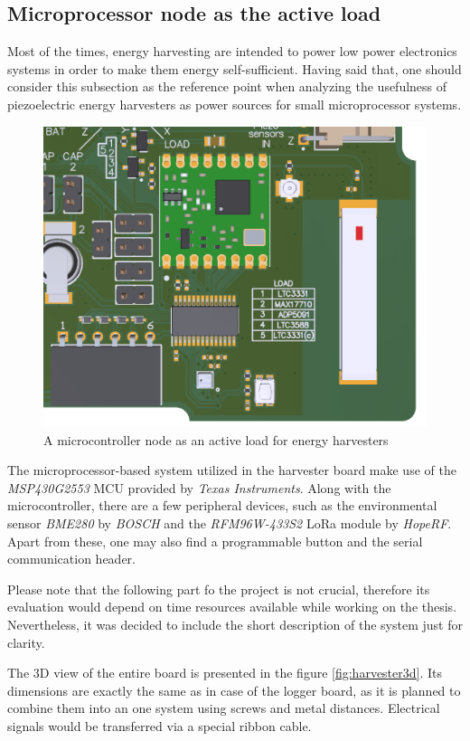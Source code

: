\documentclass[12pt,a4paper]{article}
\begin{document}
\subsection{Microprocessor node as the active load}
Most of the times, energy harvesting are intended to power low power electronics systems in order to make them energy self-sufficient. Having said that, one should consider this subsection as the reference point when analyzing the usefulness of piezoelectric energy harvesters as power sources for small microprocessor systems. \par
\begin{figure}[ht!]
\includegraphics[scale=0.75]{activeload.png}
\caption{A microcontroller node as an active load for energy harvesters}
\label{fig:activeload}
\end{figure}
The microprocessor-based system utilized in the harvester board make use of the \textit{MSP430G2553} MCU provided by \textit{Texas Instruments}. Along with the microcontroller, there are a few peripheral devices, such as the environmental sensor \textit{BME280} by \textit{BOSCH} and the \textit{RFM96W-433S2} LoRa module by \textit{HopeRF}. Apart from these, one may also find a programmable button and the serial communication header.
\par
Please note that the following part fo the project is not crucial, therefore its evaluation would depend on time resources available while working on the thesis. Nevertheless, it was decided to include the short description of the system just for clarity.
\par
The 3D view of the entire board is presented in the figure \ref{fig:harvester3d}. Its dimensions are exactly the same as in case of the logger board, as it is planned to combine them into an one system using screws and metal distances. Electrical signals would be transferred via a special ribbon cable.
\end{document}
